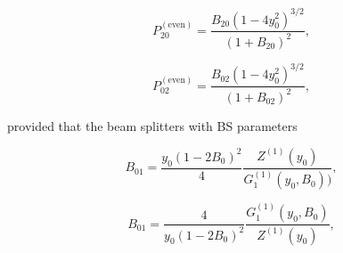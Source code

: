 \documentclass{optica-article}
\begin{document}
\begin{equation}\label{eq:22}
		P_{20}^{(\text{even})} = \frac{B_{20}(1-4y_0^2)^{3/2}}{(1+B_{20})^2},
\end{equation}


\begin{equation}\label{eq:23}
		P_{02}^{(\text{even})} = \frac{B_{02}(1-4y_0^2)^{3/2}}{(1+B_{02})^2},
\end{equation}


\!\!\!\!\!\!provided that the beam splitters with BS parameters  

\begin{equation}\label{eq:24}
		B_{01} = \frac{y_0(1-2B_0)^2}{4}\frac{Z^{(1)}(y_0)}{G_1^{(1)}(y_0,B_0))},
\end{equation}


\begin{equation}\label{eq:25}
		B_{01} = \frac{4}{y_0(1-2B_0)^2}\frac{G_1^{(1)}(y_0,B_0)}{Z^{(1)}(y_0)},
\end{equation}
\end{document}
